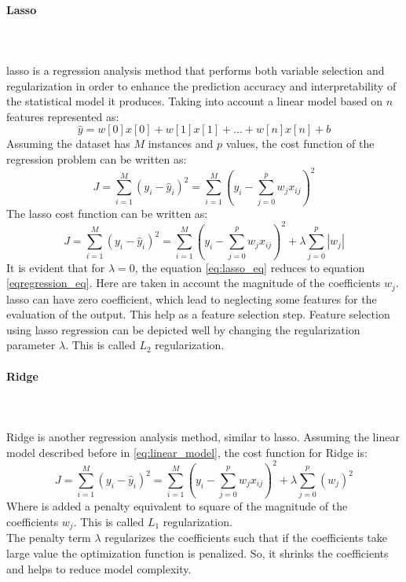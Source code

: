 \paragraph{Lasso}
\mbox{} \\ \\
\gls{lasso} is a regression analysis method that performs both variable selection and regularization in order to enhance the prediction accuracy and interpretability of the statistical model it produces.
Taking into account a linear model based on $n$ features represented as:
\begin{equation}
	\hat{y}=w[0]x[0]+w[1]x[1]+...+w[n]x[n]+b
\end{equation}\label{linear_model}
Assuming the dataset has $M$ instances and $p$ values, the cost function of the regression problem can be written as:
\begin{equation}
	J=\sum_{i=1}^{M}{{(y_i-\hat{y}_i)}^2}=\sum_{i=1}^{M}{{ \left( y_i-\sum_{j=0}^{p}{w_jx_{ij}} \right) }^2}
\end{equation}\label{regression_eq}
The \gls{lasso} cost function can be written as:
\begin{equation}
	J=\sum_{i=1}^{M}{{(y_i-\hat{y}_i)}^2}=\sum_{i=1}^{M}{{ \left( y_i-\sum_{j=0}^{p}{w_jx_{ij}} \right) }^2}+\lambda \sum_{j=0}^{p}{|w_j|}
\end{equation}\label{lasso_eq}
It is evident that for $\lambda=0$, the equation \ref{eq:lasso_eq} reduces to equation \ref{eqregression_eq}. Here are taken in account the magnitude of the coefficients $w_j$.
\\
\gls{lasso} can have zero coefficient, which lead to neglecting some features for the evaluation of the output. This help as a feature selection step. Feature selection using \gls{lasso} regression can be depicted well by changing the regularization parameter $\lambda$. This is called $L_2$ regularization.

\paragraph{Ridge}
\mbox{} \\ \\
Ridge is another regression analysis method, similar to \gls{lasso}. Assuming the linear model described before in \ref{eq:linear_model}, the cost function for Ridge is:
\begin{equation}
	J=\sum_{i=1}^{M}{{(y_i-\hat{y}_i)}^2}=\sum_{i=1}^{M}{{ \left( y_i-\sum_{j=0}^{p}{w_jx_{ij}} \right) }^2}+\lambda \sum_{j=0}^{p}{{(w_j)}^2}
\end{equation}\label{ridge_eq}
Where is added a penalty equivalent to square of the magnitude of the coefficients $w_j$. This is called $L_1$ regularization.
\\
The penalty term $\lambda$ regularizes the coefficients such that if the coefficients take large value the optimization function is penalized. So, it shrinks the coefficients and helps to reduce model complexity.

